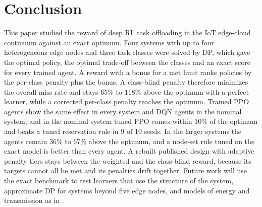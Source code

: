 \documentclass[journal]{IEEEtran}
\begin{document}
\section{Conclusion}
\label{sec:conclusion}

This paper studied the reward of deep RL task offloading in the IoT edge-cloud continuum against an exact optimum. Four systems with up to four heterogeneous edge nodes and three task classes were solved by DP, which gave the optimal policy, the optimal trade-off between the classes and an exact score for every trained agent. A reward with a bonus for a met limit ranks policies by the per-class penalty plus the bonus. A class-blind penalty therefore minimizes the overall miss rate and stays 65\% to 118\% above the optimum with a perfect learner, while a corrected per-class penalty reaches the optimum. Trained PPO agents show the same effect in every system and DQN agents in the nominal system, and in the nominal system tuned PPO comes within 10\% of the optimum and beats a tuned reservation rule in 9 of 10 seeds. In the larger systems the agents remain 36\% to 67\% above the optimum, and a node-set rule tuned on the exact model is better than every agent. A rebuilt published design with adaptive penalty tiers stays between the weighted and the class-blind reward, because its targets cannot all be met and its penalties drift together. Future work will use the exact benchmark to test learners that use the structure of the system, approximate DP for systems beyond five edge nodes, and models of energy and transmission as in \cite{hu2021,zhang2024}.
\end{document}
